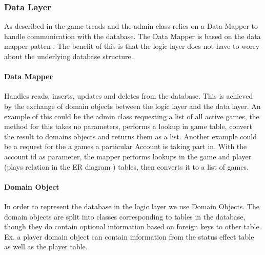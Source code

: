 \subsubsection{Data Layer}
\label{chap:dbImplementation}
As described in  the game treads and the admin class relies on a Data Mapper to handle communication with the database. The Data Mapper is based on the data mapper patten . The benefit of this is that the logic layer does not have to worry about the underlying database structure.
 
\paragraph{Data Mapper}
Handles reads, inserts, updates and deletes from the database. This is achieved by the exchange of domain objects between the logic layer and the data layer.
An example of this could be the admin class requesting a list of all active games, the method for this takes no parameters, performs a lookup in game table, convert the result to domains objects and returns them as a list.
Another example could be a request for the a games a particular Account is taking part in. With the account id as parameter, the mapper performs lookups in the game and player (plays relation in the ER diagram ) tables, then converts it to a list of games.


\paragraph{Domain Object} 
In order to represent the database in the logic layer we use Domain Objects. The domain objects are split into classes corresponding to tables in the database, though they do contain optional information based on foreign keys to other table. Ex. a player domain object can contain information from the status effect table as well as the player table.
